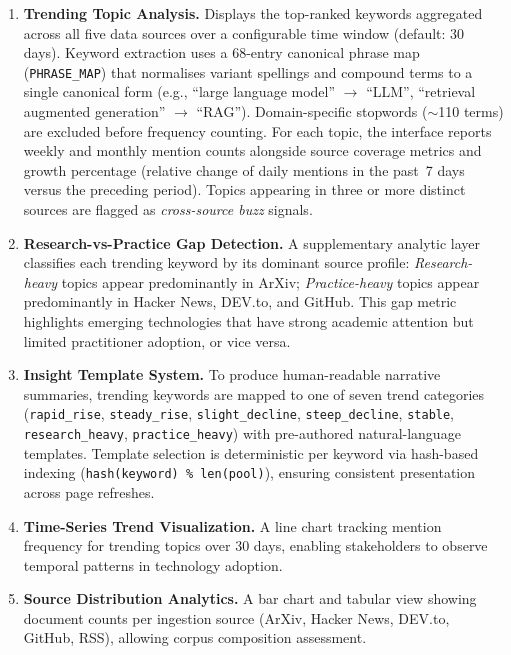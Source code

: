 \begin{enumerate}[leftmargin=0.5in]
  \item \textbf{Trending Topic Analysis.} Displays the top-ranked keywords aggregated across all five data sources over a configurable time window (default: 30 days). Keyword extraction uses a 68-entry canonical phrase map (\texttt{PHRASE\_MAP}) that normalises variant spellings and compound terms to a single canonical form (e.g., ``large language model'' $\to$ ``LLM'', ``retrieval augmented generation'' $\to$ ``RAG''). Domain-specific stopwords ($\sim$110 terms) are excluded before frequency counting. For each topic, the interface reports weekly and monthly mention counts alongside source coverage metrics and growth percentage (relative change of daily mentions in the past~7 days versus the preceding period). Topics appearing in three or more distinct sources are flagged as \emph{cross-source buzz} signals.

  \item \textbf{Research-vs-Practice Gap Detection.} A supplementary analytic layer classifies each trending keyword by its dominant source profile: \textit{Research-heavy} topics appear predominantly in ArXiv; \textit{Practice-heavy} topics appear predominantly in Hacker News, DEV.to, and GitHub. This gap metric highlights emerging technologies that have strong academic attention but limited practitioner adoption, or vice versa.

  \item \textbf{Insight Template System.} To produce human-readable narrative summaries, trending keywords are mapped to one of seven trend categories (\texttt{rapid\_rise}, \texttt{steady\_rise}, \texttt{slight\_decline}, \texttt{steep\_decline}, \texttt{stable}, \texttt{research\_heavy}, \texttt{practice\_heavy}) with pre-authored natural-language templates. Template selection is deterministic per keyword via hash-based indexing (\texttt{hash(keyword) \% len(pool)}), ensuring consistent presentation across page refreshes.

  \item \textbf{Time-Series Trend Visualization.} A line chart tracking mention frequency for trending topics over 30 days, enabling stakeholders to observe temporal patterns in technology adoption.

  \item \textbf{Source Distribution Analytics.} A bar chart and tabular view showing document counts per ingestion source (ArXiv, Hacker News, DEV.to, GitHub, RSS), allowing corpus composition assessment.


\end{enumerate}
